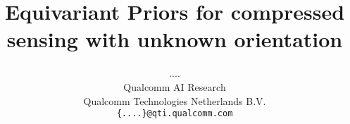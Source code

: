 \title{Equivariant Priors for compressed sensing with unknown orientation}

\author{....\\
Qualcomm AI Research \\
Qualcomm Technologies Netherlands B.V. \\
\texttt{\{....\}@qti.qualcomm.com} \\
}

